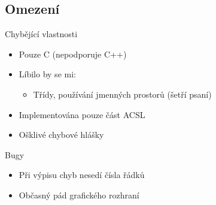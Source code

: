 \documentclass[11pt]{beamer}
\begin{document}
\subsection{Omezení}

\begin{frame}{Chybějící vlastnosti}
	\begin{itemize}
		\item Pouze C (nepodporuje C++)
		\pause \item Líbilo by se mi:
			\begin{itemize}
				\pause \item Třídy, používání jmenných prostorů (šetří psaní)
			\end{itemize}
		\pause \item Implementována pouze část ACSL
		\pause \item Ošklivé chybové hlášky
	\end{itemize}
\end{frame}


\begin{frame}{Bugy}
	\begin{itemize}
		\item Při výpisu chyb nesedí čísla řádků
		\item Občasný pád grafického rozhraní
	\end{itemize}
\end{frame}
\end{document}
